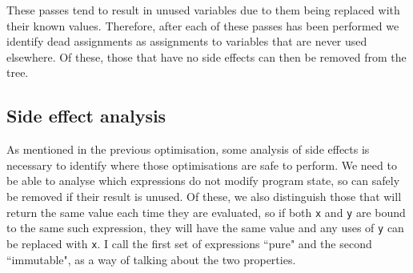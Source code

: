 These passes tend to result in unused variables due to them being replaced with their known values. Therefore, after each of these passes has been performed we identify dead assignments as assignments to variables that are never used elsewhere. Of these, those that have no side effects can then be removed from the tree.



\subsection{Side effect analysis}
As mentioned in the previous optimisation, some analysis of side effects is necessary to identify where those optimisations are safe to perform.
We need to be able to analyse which expressions do not modify program state, so can safely be removed if their result is unused. Of these, we also distinguish those that will return the same value each time they are evaluated, so if both \verb|x| and \verb|y| are bound to the same such expression, they will have the same value and any uses of \verb|y| can be replaced with \verb|x|. I call the first set of expressions ``pure" and the second ``immutable", as a way of talking about the two properties.

